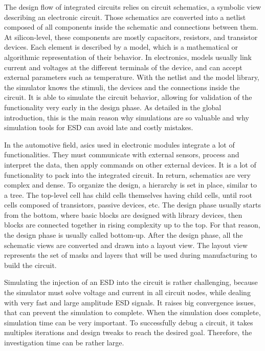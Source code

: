 The design flow of integrated circuits relies on circuit schematics, a symbolic view describing an electronic circuit.
Those schematics are converted into a netlist composed of all components inside the schematic and connections between them.
At silicon-level, these components are mostly capacitors, resistors, and transistor devices.
Each element is described by a model, which is a mathematical or algorithmic representation of their behavior.
In electronics, models usually link current and voltages at the different terminals of the device, and can accept external parameters such as temperature.
With the netlist and the model library, the simulator knows the stimuli, the devices and the connections inside the circuit.
It is able to simulate the circuit behavior, allowing for validation of the functionality very early in the design phase.
As detailed in the global introduction, this is the main reason why simulations are so valuable and why simulation tools for ESD can avoid late and costly mistakes.

In the automotive field, \gls{asic}s used in electronic modules integrate a lot of functionalities.
They must communicate with external sensors, process and interpret the data, then apply commands on other external devices.
It is a lot of functionality to pack into the integrated circuit.
In return, schematics are very complex and dense.
To organize the design, a hierarchy is set in place, similar to a tree.
The top-level cell has child cells themselves having child cells, until root cells composed of transistors, passive devices, etc.
The design phase usually starts from the bottom, where basic blocks are designed with library devices, then blocks are connected together in rising complexity up to the top.
For that reason, the design phase is usually called bottom-up.
After the design phase, all the schematic views are converted and drawn into a layout view.
The layout view represents the set of masks and layers that will be used during manufacturing to build the circuit.

Simulating the injection of an ESD into the circuit is rather challenging, because the simulator must solve voltage and current in all circuit nodes, while dealing with very fast and large amplitude ESD signals.
It raises big convergence issues, that can prevent the simulation to complete.
When the simulation does complete, simulation time can be very important.
To successfully debug a circuit, it takes multiples iterations and design tweaks to reach the desired goal.
Therefore, the investigation time can be rather large.

